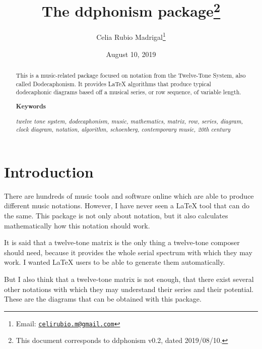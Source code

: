 \documentclass{article}
\title{The \textsf{ddphonism} package\footnote{This
		document corresponds to \textsf{ddphonism} v0.2, dated 2019/08/10.}}
\author{Celia Rubio Madrigal\footnote{Email: \href{mailto:celirubio.m@gmail.com}{\texttt{celirubio.m@gmail.com}}}}
\date{August 10, 2019}
\begin{document}
	
	\maketitle
	
	\begin{abstract}
		This is a music-related package focused on notation from the Twelve-Tone System, also called Dodecaphonism. It provides \LaTeX{} algorithms that produce typical dodecaphonic diagrams based off a musical series, or row sequence, of variable length.
		
		\begin{center}
			\textbf{Keywords}
		\end{center}
	
		\textit{twelve tone system, dodecaphonism, music, mathematics, matrix, row, series, diagram, clock diagram, notation, algorithm, schoenberg, contemporary music, 20th century}
	\end{abstract}


	\tableofcontents
	
	\section{Introduction}
	There are hundreds of music tools and software online which are able to produce different music notations. However, I have never seen a \LaTeX{} tool that can do the same. This package is not only about notation, but it also calculates mathematically how this notation should work.
	
	It is said that a twelve-tone matrix is the only thing a twelve-tone composer should need, because it provides the whole serial spectrum with which they may work. I wanted \LaTeX{} users to be able to generate them automatically.
	
	But I also think that a twelve-tone matrix is not enough, that there exist several other notations with which they may understand their series and their potential. These are the diagrams that can be obtained with this package.
	
	\begin{multicols}{2}
		
		
		
		
		\bigskip
	\end{multicols}
	
\end{document}
